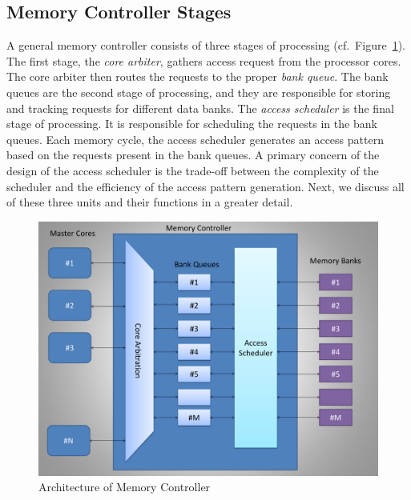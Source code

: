 \subsection{Memory Controller Stages}
A general memory controller consists of three stages of processing (cf.~Figure~\ref{fig:pseudo-code}). The first stage, the {\em core arbiter}, gathers access request from the processor cores. The core arbiter then routes the requests to the proper {\em bank queue}. The bank queues are the second stage of processing, and they are responsible for storing and tracking requests for different data banks. The {\em access scheduler} is the final stage of processing. It is responsible for scheduling the requests in the bank queues. Each memory cycle, the access scheduler generates an access pattern based on the requests present in the bank queues. A primary concern of the design of the access scheduler is the trade-off between the complexity of the scheduler and the efficiency of the access pattern generation. Next, we discuss all of these three units and their functions in a greater detail.
\begin{figure}[htbp]
\centering
	\includegraphics[width=0.7\linewidth]{fig/controllerArchitecture.pdf}
\caption{
{Architecture of Memory Controller} }
\label{fig:pseudo-code}
\end{figure}

